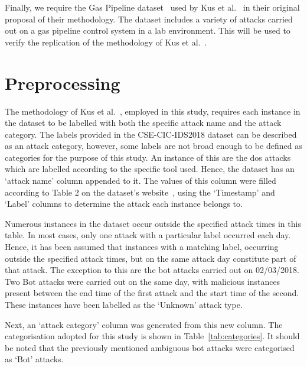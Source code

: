 Finally, we require the Gas Pipeline dataset~\cite{gas_pipeline_dataset} used
by Kus et al.~\cite{Kus} in their original proposal of their methodology. The
dataset includes a variety of attacks carried out on a gas pipeline control
system in a lab environment. This will be used to verify the replication of the
methodology of Kus et al.~\cite{Kus}.

\section{Preprocessing}%
\label{sec:preprocessing}

The methodology of Kus et al.~\cite{Kus}, employed in this study, requires each
instance in the dataset to be labelled with both the specific attack name and
the attack category. The labels provided in the CSE-CIC-IDS2018 dataset can be
described as an attack category, however, some labels are not broad enough to
be defined as categories for the purpose of this study. An instance of this are
the \gls{dos} attacks which are labelled according to the specific tool used.
Hence, the dataset has an `attack name' column appended to it. The values of
this column were filled according to Table 2 on the dataset's
website~\cite{cic2018}, using the `Timestamp' and `Label' columns to determine
the attack each instance belongs to.

Numerous instances in the dataset occur outside the specified attack times in
this table. In most cases, only one attack with a particular label occurred
each day. Hence, it has been assumed that instances with a matching label,
occurring outside the specified attack times, but on the same attack day
constitute part of that attack. The exception to this are the bot attacks
carried out on 02/03/2018. Two Bot attacks were carried out on the same day,
with malicious instances present between the end time of the first attack and
the start time of the second. These instances have been labelled as the
`Unknown' attack type.

Next, an `attack category' column was generated from this new column. The
categorisation adopted for this study is shown in Table~\ref{tab:categories}.
It should be noted that the previously mentioned ambiguous bot attacks were
categorised as `Bot' attacks.

